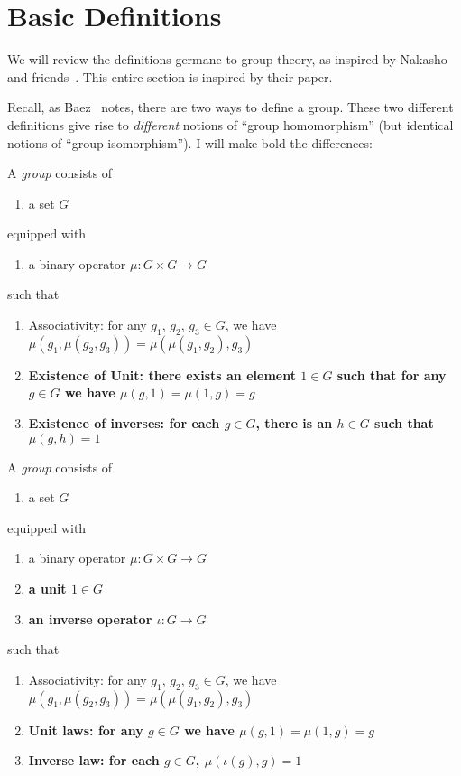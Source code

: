 \section{Basic Definitions}

We will review the definitions germane to group theory, as inspired
by Nakasho and friends~\cite{nakasho2014formalization}. This entire
section is inspired by their paper.

Recall, as Baez~\cite[week one]{baez2004qg-lectures} notes, there are
two ways to define a group. These two different definitions give rise to
\emph{different} notions of ``group homomorphism'' (but identical
notions of ``group isomorphism''). I will make bold the differences:

\begin{definition}[Version 1]\label{defn:introduction:mizar-style-group}
  A \emph{group} consists of
  \begin{enumerate}
  \item a set $G$
  \end{enumerate}
  equipped with
  \begin{enumerate}
  \item a binary operator $\mu\colon G\times G\to G$
  \end{enumerate}
  such that
  \begin{enumerate}
  \item Associativity: for any $g_{1}$, $g_{2}$, $g_{3}\in G$, we have
    $\mu(g_{1}, \mu(g_{2},g_{3})) = \mu(\mu(g_{1},g_{2}),g_{3})$
  \item \textbf{Existence of Unit: there exists an element $1\in G$ such
    that for any $g\in G$ we have $\mu(g,1)=\mu(1,g)=g$}
  \item \textbf{Existence of inverses: for each $g\in G$, there is an
    $h\in G$ such that $\mu(g,h)=1$}
  \end{enumerate}
\end{definition}

\begin{definition}[Version 2]
  A \emph{group} consists of
  \begin{enumerate}
  \item a set $G$
  \end{enumerate}
  equipped with
  \begin{enumerate}
  \item a binary operator $\mu\colon G\times G\to G$
  \item \textbf{a unit $1\in G$}
  \item \textbf{an inverse operator $\iota\colon G\to G$}
  \end{enumerate}
  such that
  \begin{enumerate}
  \item Associativity: for any $g_{1}$, $g_{2}$, $g_{3}\in G$, we have
    $\mu(g_{1}, \mu(g_{2},g_{3})) = \mu(\mu(g_{1},g_{2}),g_{3})$
  \item \textbf{Unit laws: for any $g\in G$ we have $\mu(g,1)=\mu(1,g)=g$}
  \item \textbf{Inverse law: for each $g\in G$, $\mu(\iota(g),g)=1$}
  \end{enumerate}
\end{definition}

